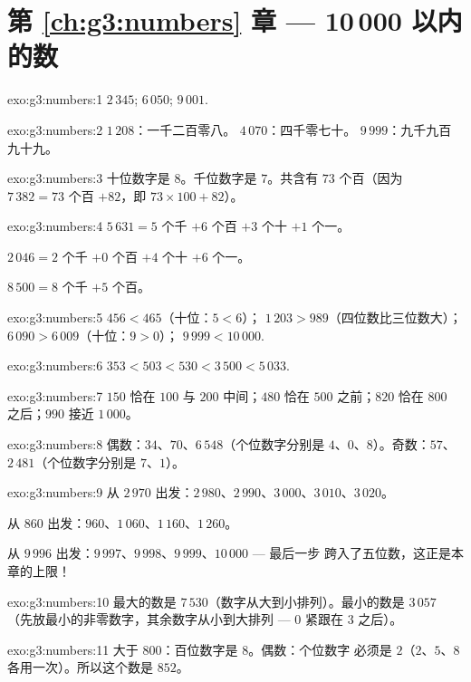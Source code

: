 \section*{第 \ref{ch:g3:numbers} 章 --- 10\,000 以内的数}

\begin{solution}{exo:g3:numbers:1}
$2\,345$; \quad $6\,050$; \quad $9\,001$.
\end{solution}

\begin{solution}{exo:g3:numbers:2}
$1\,208$：一千二百零八。\quad
$4\,070$：四千零七十。\quad
$9\,999$：九千九百九十九。
\end{solution}

\begin{solution}{exo:g3:numbers:3}
十位数字是 $8$。千位数字是 $7$。共含有
$73$ 个百（因为 $7\,382 = 73$ 个百 $+ 82$，即
$73 \times 100 + 82$）。
\end{solution}

\begin{solution}{exo:g3:numbers:4}
$5\,631 = 5$ 个千 $+ 6$ 个百 $+ 3$ 个十 $+ 1$ 个一。

$2\,046 = 2$ 个千 $+ 0$ 个百 $+ 4$ 个十 $+ 6$ 个一。

$8\,500 = 8$ 个千 $+ 5$ 个百。
\end{solution}

\begin{solution}{exo:g3:numbers:5}
$456 < 465$（十位：$5 < 6$）；\quad
$1\,203 > 989$（四位数比三位数大）；\quad
$6\,090 > 6\,009$（十位：$9 > 0$）；\quad
$9\,999 < 10\,000$.
\end{solution}

\begin{solution}{exo:g3:numbers:6}
$353 < 503 < 530 < 3\,500 < 5\,033$.
\end{solution}

\begin{solution}{exo:g3:numbers:7}
$150$ 恰在 $100$ 与 $200$ 中间；$480$ 恰在
$500$ 之前；$820$ 恰在 $800$ 之后；$990$ 接近 $1\,000$。
\end{solution}

\begin{solution}{exo:g3:numbers:8}
偶数：$34$、$70$、$6\,548$（个位数字分别是 $4$、$0$、$8$）。奇数：$57$、
$2\,481$（个位数字分别是 $7$、$1$）。
\end{solution}

\begin{solution}{exo:g3:numbers:9}
从 $2\,970$ 出发：$2\,980$、$2\,990$、$3\,000$、$3\,010$、$3\,020$。

从 $860$ 出发：$960$、$1\,060$、$1\,160$、$1\,260$。

从 $9\,996$ 出发：$9\,997$、$9\,998$、$9\,999$、$10\,000$ --- 最后一步
跨入了五位数，这正是本章的上限！
\end{solution}

\begin{solution}{exo:g3:numbers:10}
最大的数是 $7\,530$（数字从大到小排列）。最小的数是 $3\,057$
（先放最小的非零数字，其余数字从小到大排列 --- $0$
紧跟在 $3$ 之后）。
\end{solution}

\begin{solution}{exo:g3:numbers:11}
大于 $800$：百位数字是 $8$。偶数：个位数字
必须是 $2$（$2$、$5$、$8$ 各用一次）。所以这个数是
$852$。
\end{solution}
